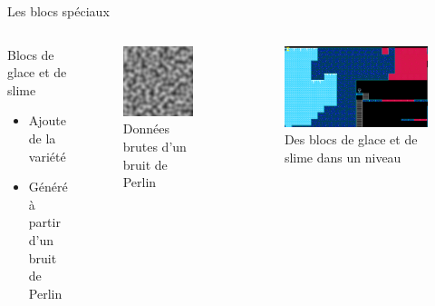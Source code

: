 \documentclass{beamer}
\begin{document}
{\begin{frame}{Les blocs spéciaux}
    \begin{columns}
        \begin{block}{Blocs de glace et de slime}
            \begin{itemize}
                \item[\bullet] Ajoute de la variété
                \item[\bullet] Généré à partir d'un bruit de Perlin
            \end{itemize}
        \end{block}
        \begin{figure}
            \centering
            \includegraphics[height=0.2\textheight]{images/perlin_noise_example}
            \caption{Données brutes d'un bruit de Perlin}
        \end{figure}
        \begin{figure}
            \centering
            \includegraphics[height=0.2\textheight]{images/perlin_noise_in_level}
            \caption{Des blocs de glace et de slime dans un niveau}
        \end{figure}
    \end{columns}
\end{frame}

}
\end{document}
